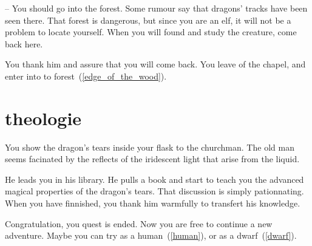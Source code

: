 -- You should go into the forest. Some rumour say that dragons' tracks have been
seen there. That forest is dangerous, but since you are an elf, it will not be a
problem to locate yourself. When you will found and study the creature, come
back here.

You thank him and assure that you will come back. You leave of the chapel, and
enter into to forest~(\ref{edge_of_the_wood}).

\section{theologie}

You show the dragon's tears inside your flask to the churchman. The old man seems
facinated by the reflects of the iridescent light that arise from the liquid.

He leads you in his library. He pulls a book and start to teach you the advanced
magical properties of the dragon's tears. That discussion is simply
pationnating. When you have finnished, you thank him warmfully to transfert his
knowledge.

Congratulation, you quest is ended. Now you are free to continue a new
adventure. Maybe you can try as a human~(\ref{human}), or as a
dwarf~(\ref{dwarf}).
